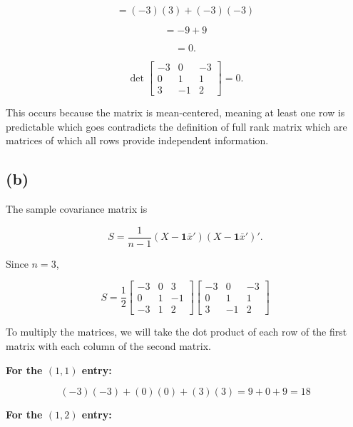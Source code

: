 \documentclass{article}
\begin{document}
$$
=
(-3)(3)+(-3)(-3)
$$

$$
=
-9+9
$$

$$
=0.
$$

$$
\boxed{
\det
\begin{bmatrix}
-3&0&-3\\
0&1&1\\
3&-1&2
\end{bmatrix}
=0
}.
$$

\begin{center}
\end{center}

This occurs because the matrix is mean-centered, meaning at least one row is predictable which goes contradicts the definition of full rank matrix which are matrices of which all rows provide independent information.


\subsection*{(b)}

The sample covariance matrix is

$$
S=
\frac{1}{n-1}
(X-\mathbf{1}\bar{x}')
(X-\mathbf{1}\bar{x}')'.
$$

Since $n=3$,

$$
S =
\frac{1}{2}
\begin{bmatrix}
-3 & 0 & 3 \\
0 & 1 & -1 \\
-3 & 1 & 2
\end{bmatrix}
\begin{bmatrix}
-3 & 0 & -3 \\
0 & 1 & 1 \\
3 & -1 & 2
\end{bmatrix}
$$

\noindent
To multiply the matrices, we will take the dot product of each row of the first
matrix with each column of the second matrix.

\vspace{0.2cm}

\noindent
\textbf{For the $(1,1)$ entry:}

$$
(-3)(-3) + (0)(0) + (3)(3)
=
9 + 0 + 9
=
18
$$

\noindent
\textbf{For the $(1,2)$ entry:}
\end{document}
